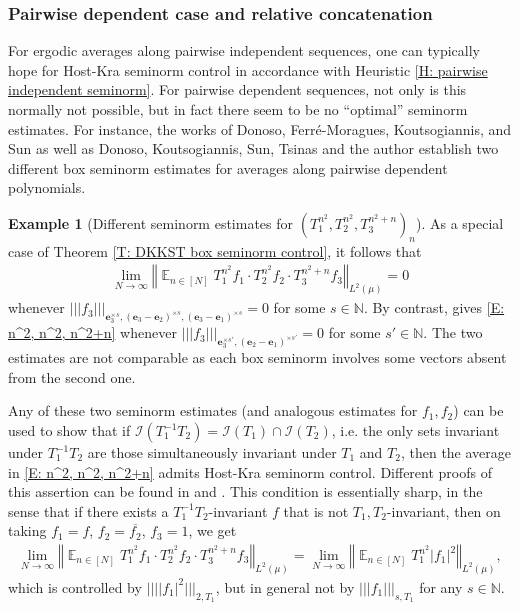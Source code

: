 \documentclass[11pt]{amsart}
\theoremstyle{definition}
\newtheorem{example}[lemma]{Example}
\DeclareMathOperator*{\E}{\mathbb{E}}
\newcommand{\N}{{\mathbb N}}
\newcommand{\CI}{{\mathcal I}}
\newcommand{\be}{{\mathbf{e}}}
\newcommand{\norm}[1]{\left\Vert #1\right\Vert}
\newcommand{\nnorm}[1]{\lvert\!|\!| #1|\!|\!\rvert}
\newcommand{\inv}{^{-1}}
\newcommand{\1}{{\mathbf{1}}}
\begin{document}
\subsubsection{Pairwise dependent case and relative concatenation}\label{SSS: pairwise dependence}
For ergodic averages along pairwise independent sequences, %
one can typically hope for Host-Kra seminorm control in accordance with Heuristic \ref{H: pairwise independent seminorm}. For pairwise dependent sequences, not only is this normally not possible, but in fact there seem to be no ``optimal'' seminorm estimates. For instance, the works of Donoso, Ferr\'e-Moragues, Koutsogiannis, and Sun \cite{DFKS22} as well as Donoso, Koutsogiannis, Sun, Tsinas and the author \cite{DKKST25} establish two different box seminorm estimates for averages along pairwise dependent polynomials.
\begin{example}[Different seminorm estimates for $(T_1^{n^2}, T_2^{n^2}, T_3^{n^2+n})_n$]\label{Ex: n^2, n^2, n^2+n}
    As a special case of Theorem \ref{T: DKKST box seminorm control}, it follows that
    \begin{align}\label{E: n^2, n^2, n^2+n}
        \lim_{N\to\infty}\norm{\E_{n\in[N]}T_1^{n^2}f_1\cdot T_2^{n^2}f_2\cdot T_3^{n^2+n}f_3}_{L^2(\mu)} = 0
    \end{align}
    whenever $\nnorm{f_3}_{\be_3^{\times s}, (\be_3-\be_2)^{\times s}, (\be_3-\be_1)^{\times s}} = 0$ for some $s\in\N$. By contrast, \cite[Theorem 4.5]{DKKST25} gives \eqref{E: n^2, n^2, n^2+n} whenever $\nnorm{f_3}_{\be_3^{\times s'}, (\be_2-\be_1)^{\times s'}} = 0$ for some $s'\in\N$. 
    The two estimates are not comparable as each box seminorm involves some vectors absent from the second one. 
    
    Any of these two seminorm estimates (and analogous estimates for $f_1,f_2$) can be used to show that if $\CI(T_1\inv T_2) = \CI(T_1)\cap \CI(T_2)$, i.e. the only sets invariant under $T_1\inv T_2$ are those simultaneously invariant under $T_1$ and $T_2$, then the average in  \eqref{E: n^2, n^2, n^2+n} admits Host-Kra seminorm control. Different proofs of this assertion can be found in \cite{FrKu22b} and \cite{DKKST25}. This condition is essentially sharp, in the sense that if there exists a $T_1\inv T_2$-invariant $f$ that is not $T_1,T_2$-invariant, then on taking $f_1 = f$, $f_2 = \overline{f_2}$, $f_3 =1$, we get 
    \begin{align*}
        \lim_{N\to\infty}\norm{\E_{n\in[N]}T_1^{n^2}f_1\cdot T_2^{n^2}f_2\cdot T_3^{n^2+n}f_3}_{L^2(\mu)} = \lim_{N\to\infty}\norm{\E_{n\in[N]}T_1^{n^2}|f_1|^2}_{L^2(\mu)},
    \end{align*}
    which is controlled by $\nnorm{|f_1|^2}_{2,T_1}$, but in general not by $\nnorm{f_1}_{s,T_1}$ for any $s\in\N$.
\end{example}
\end{document}
